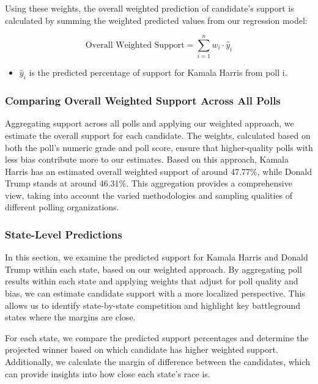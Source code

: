 \documentclass[
  letterpaper,
  DIV=11,
  numbers=noendperiod]{scrartcl}
\providecommand{\tightlist}{%
  \setlength{\itemsep}{0pt}\setlength{\parskip}{0pt}}\usepackage{longtable,booktabs,array}
\begin{document}
Using these weights, the overall weighted prediction of candidate's
support is calculated by summing the weighted predicted values from our
regression model:

\[
\text{Overall Weighted Support} = \sum_{i=1}^{n} w_i \cdot \hat{y}_i
\]

\begin{itemize}
\tightlist
\item
  \(\hat{y}_i\) is the predicted percentage of support for Kamala Harris
  from poll i.
\end{itemize}

\hypertarget{comparing-overall-weighted-support-across-all-polls}{%
\subsubsection{Comparing Overall Weighted Support Across All
Polls}\label{comparing-overall-weighted-support-across-all-polls}}

Aggregating support across all polls and applying our weighted approach,
we estimate the overall support for each candidate. The weights,
calculated based on both the poll's numeric grade and poll score, ensure
that higher-quality polls with less bias contribute more to our
estimates. Based on this approach, Kamala Harris has an estimated
overall weighted support of around 47.77\%, while Donald Trump stands at
around 46.31\%. This aggregation provides a comprehensive view, taking
into account the varied methodologies and sampling qualities of
different polling organizations.

\hypertarget{state-level-predictions}{%
\subsubsection{State-Level Predictions}\label{state-level-predictions}}

In this section, we examine the predicted support for Kamala Harris and
Donald Trump within each state, based on our weighted approach. By
aggregating poll results within each state and applying weights that
adjust for poll quality and bias, we can estimate candidate support with
a more localized perspective. This allows us to identify state-by-state
competition and highlight key battleground states where the margins are
close.

For each state, we compare the predicted support percentages and
determine the projected winner based on which candidate has higher
weighted support. Additionally, we calculate the margin of difference
between the candidates, which can provide insights into how close each
state's race is.
\end{document}
